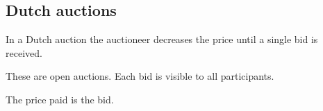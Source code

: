 
\subsection{Dutch auctions}

In a Dutch auction the auctioneer decreases the price until a single bid is received.

These are open auctions. Each bid is visible to all participants.

The price paid is the bid.

